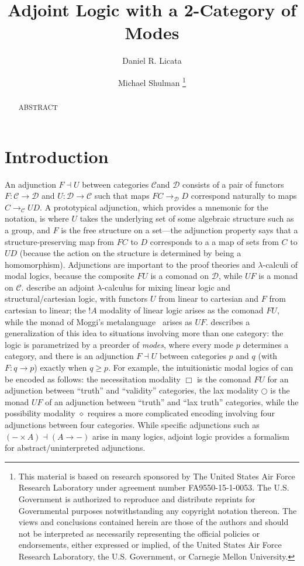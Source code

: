 \documentclass{drl-common/llncs}
\title{Adjoint Logic with a 2-Category of Modes}
\author{Daniel R. Licata\inst{1} \and Michael Shulman\inst{2}
\thanks{
This material is based on research sponsored by The United States Air
Force Research Laboratory under agreement number FA9550-15-1-0053. The
U.S. Government is authorized to reproduce and distribute reprints for
Governmental purposes notwithstanding any copyright notation thereon.
The views and conclusions contained herein are those of the authors and
should not be interpreted as necessarily representing the official
policies or endorsements, either expressed or implied, of the United
States Air Force Research Laboratory, the U.S. Government, or Carnegie
Mellon University.
}}
\institute{Wesleyan University \and University of San Diego}
\newcommand{\C}{\ensuremath{\mathcal{C}}}
\newcommand{\D}{\ensuremath{\mathcal{D}}}
\newcommand{\la}{\ensuremath{\dashv}}
\newcommand{\arrow}[3]{\ensuremath{#2 \longrightarrow_{#1} #3}}
\begin{document}
\maketitle

\begin{abstract}
ABSTRACT
\end{abstract}

\section{Introduction}


An adjunction $F \la U$ between categories \C and \D\/ consists of a
pair of functors $F : \C \to \D$ and $U : \D \to \C$ such that maps
\arrow{\D}{F C}{D} correspond naturally to maps \arrow{\C}{C}{U D}.  A
prototypical adjunction, which provides a mnemonic for the notation, is
where $U$ takes the underlying set of some algebraic structure such as a
group, and $F$ is the free structure on a set---the adjunction property
says that a structure-preserving map from $F C$ to $D$ corresponds to a
a map of sets from $C$ to $U D$ (because the action on the structure is
determined by being a homomorphism).  Adjunctions are important to the
proof theories and $\lambda$-calculi of modal logics, because the
composite $FU$ is a comonad on \D, while $UF$ is a monad on $\C$.
\citet{bentonwadler96adjoint} describe an adjoint $\lambda$-calculus for
mixing linear logic and structural/cartesian logic, with functors $U$
from linear to cartesian and $F$ from cartesian to linear; the $! A$
modality of linear logic arises as the comonad $FU$, while the monad of
Moggi's metalanguage~\citep{moggi91monad} arises as $UF$.
\citet{reed09adjoint} describes a generalization of this idea to
situations involving more than one category: the logic is parametrized
by a preorder of \emph{modes}, where every mode $p$ determines a
category, and there is an adjunction $F \la U$ between categories $p$
and $q$ (with $F : q \to p$) exactly when $q \ge p$.  For example, the
intuitionistic modal logics of \citet{pfenningdavies} can be encoded as
follows: the necessitation modality $\Box$ is the comonad $FU$ for an
adjunction between ``truth'' and ``validity'' categories, the lax
modality $\bigcirc$ is the monad $UF$ of an adjunction between ``truth''
and ``lax truth'' categories, while the possibility modality $\diamond$
requires a more complicated encoding involving four adjunctions between
four categories.  While specific adjunctions such as $(- \times A) \la
(A \to -)$ arise in many logics, adjoint logic provides a formalism for
abstract/uninterpreted adjunctions.
\end{document}
